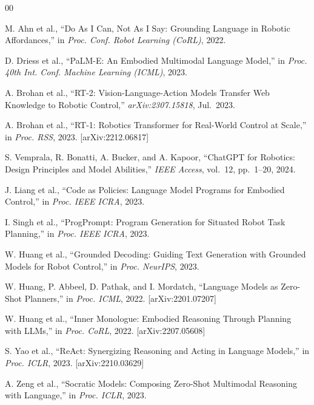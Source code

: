 \documentclass[conference]{IEEEtran}
\begin{document}
\begin{thebibliography}{00}

M. Ahn et al.,
``Do As I Can, Not As I Say: Grounding Language in Robotic Affordances,''
in \textit{Proc. Conf. Robot Learning (CoRL)}, 2022.

D. Driess et al.,
``PaLM-E: An Embodied Multimodal Language Model,''
in \textit{Proc. 40th Int. Conf. Machine Learning (ICML)}, 2023.

A. Brohan et al.,
``RT-2: Vision-Language-Action Models Transfer Web Knowledge to
Robotic Control,'' \textit{arXiv:2307.15818}, Jul.\ 2023.

A. Brohan et al.,
``RT-1: Robotics Transformer for Real-World Control at Scale,''
in \textit{Proc. RSS}, 2023. [arXiv:2212.06817]

S. Vemprala, R. Bonatti, A. Bucker, and A. Kapoor,
``ChatGPT for Robotics: Design Principles and Model Abilities,''
\textit{IEEE Access}, vol.~12, pp.~1--20, 2024.

J. Liang et al.,
``Code as Policies: Language Model Programs for Embodied Control,''
in \textit{Proc. IEEE ICRA}, 2023.

I. Singh et al.,
``ProgPrompt: Program Generation for Situated Robot Task Planning,''
in \textit{Proc. IEEE ICRA}, 2023.

W. Huang et al.,
``Grounded Decoding: Guiding Text Generation with Grounded Models for
Robot Control,'' in \textit{Proc. NeurIPS}, 2023.

W. Huang, P. Abbeel, D. Pathak, and I. Mordatch,
``Language Models as Zero-Shot Planners,''
in \textit{Proc. ICML}, 2022. [arXiv:2201.07207]

W. Huang et al.,
``Inner Monologue: Embodied Reasoning Through Planning with LLMs,''
in \textit{Proc. CoRL}, 2022. [arXiv:2207.05608]

S. Yao et al.,
``ReAct: Synergizing Reasoning and Acting in Language Models,''
in \textit{Proc. ICLR}, 2023. [arXiv:2210.03629]

A. Zeng et al.,
``Socratic Models: Composing Zero-Shot Multimodal Reasoning with Language,''
in \textit{Proc. ICLR}, 2023.


\end{thebibliography}
\end{document}
